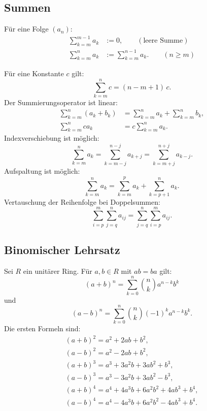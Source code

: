 \subsection{Summen}
\begin{Definition} Für eine Folge $(a_n)$:
\begin{align}
\sum_{k=m}^{m-1} a_k &:= 0,\qquad(\text{leere Summe})\\
\sum_{k=m}^n a_k &:= \sum_{k=m}^{n-1} a_k.\qquad(n\ge m)
\end{align}
\end{Definition}
\noindent
Für eine Konstante $c$ gilt:
\begin{equation}
\sum_{k=m}^n c = (n-m+1)\,c.
\end{equation}
Der Summierungsoperator ist linear:
\begin{align}
\sum_{k=m}^n (a_k+b_k) &= \sum_{k=m}^n a_k + \sum_{k=m}^n b_k,\\
\sum_{k=m}^n ca_k &= c\sum_{k=m}^n a_k.
\end{align}
Indexverschiebung ist möglich:
\begin{equation}
\sum_{k=m}^n a_k = \sum_{k=m-j}^{n-j} a_{k+j} = \sum_{k=m+j}^{n+j} a_{k-j}.
\end{equation}
Aufspaltung ist möglich:
\begin{equation}
\sum_{k=m}^n a_k = \sum_{k=m}^p a_k + \sum_{k=p+1}^n a_k.
\end{equation}
Vertauschung der Reihenfolge bei Doppelsummen:
\begin{equation}
\sum_{i=p}^m \sum_{j=q}^n a_{ij} = \sum_{j=q}^n \sum_{i=p}^m a_{ij}.
\end{equation}

\subsection{Binomischer Lehrsatz}
Sei $R$ ein unitärer Ring. 
Für $a,b\in R$ mit $ab=ba$ gilt:%
\begin{equation}
(a+b)^n = \sum_{k=0}^n \binom{n}{k} a^{n-k} b^k
\end{equation}
und
\begin{equation}
(a-b)^n = \sum_{k=0}^n \binom{n}{k} (-1)^k a^{n-k} b^k.
\end{equation}
Die ersten Formeln sind:
\begin{gather}
(a+b)^2 = a^2+2ab+b^2,\\
(a-b)^2 = a^2-2ab+b^2,\\
(a+b)^3 = a^3+3a^2 b+3ab^2+b^3,\\
(a-b)^3 = a^3-3a^2 b+3ab^2-b^3,\\
(a+b)^4 = a^4+4a^3 b+6a^2 b^2+4ab^3+b^4,\\
(a-b)^4 = a^4-4a^3 b+6a^2 b^2-4ab^3+b^4.
\end{gather}

